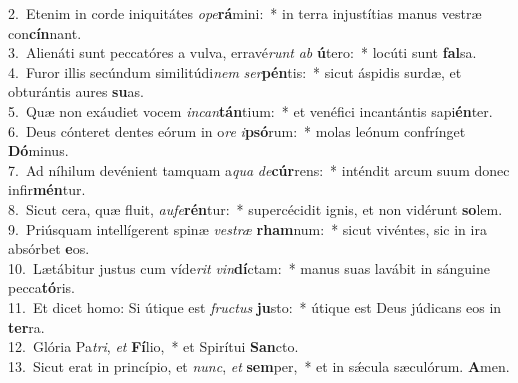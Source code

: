 {2.~}Etenim in corde iniquitátes \textit{o}\textit{pe}\textbf{rá}mini:~* in terra injustítias manus vestræ con\textbf{cín}nant.\\
{3.~}Alienáti sunt peccatóres a vulva, erravé\textit{runt} \textit{ab} \textbf{ú}tero:~* locúti sunt \textbf{fal}sa.\\
{4.~}Furor illis secúndum similitúdi\textit{nem} \textit{ser}\textbf{pén}tis:~* sicut áspidis surdæ, et obturántis aures \textbf{su}as.\\
{5.~}Quæ non exáudiet vocem \textit{in}\textit{can}\textbf{tán}tium:~* et venéfici incantántis sapi\textbf{én}ter.\\
{6.~}Deus cónteret dentes eórum in o\textit{re} \textit{i}\textbf{psó}rum:~* molas leónum confrínget \textbf{Dó}minus.\\
{7.~}Ad níhilum devénient tamquam a\textit{qua} \textit{de}\textbf{cúr}rens:~* inténdit arcum suum donec infir\textbf{mén}tur.\\
{8.~}Sicut cera, quæ fluit, \textit{au}\textit{fe}\textbf{rén}tur:~* supercécidit ignis, et non vidérunt \textbf{so}lem.\\
{9.~}Priúsquam intellígerent spinæ \textit{ve}\textit{stræ} \textbf{rham}num:~* sicut vivéntes, sic in ira absórbet \textbf{e}os.\\
{10.~}Lætábitur justus cum víde\textit{rit} \textit{vin}\textbf{dí}ctam:~* manus suas lavábit in sánguine pecca\textbf{tó}ris.\\
{11.~}Et dicet homo: Si útique est \textit{fru}\textit{ctus} \textbf{ju}sto:~* útique est Deus júdicans eos in \textbf{ter}ra.\\
{12.~}Glória Pa\textit{tri}, \textit{et} \textbf{Fí}lio,~* et Spirítui \textbf{San}cto.\\
{13.~}Sicut erat in princípio, et \textit{nunc}, \textit{et} \textbf{sem}per,~* et in sǽcula sæculórum. \textbf{A}men.\\
